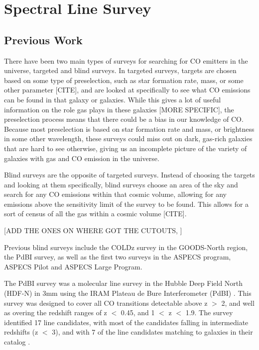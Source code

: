 \chapter{Spectral Line Survey}

\section{Previous Work}

There have been two main types of surveys for searching for CO emitters in the universe, targeted and blind surveys. In targeted surveys, targets are chosen based on some type of preselection, such as star formation rate, mass, or some other parameter [CITE], and are looked at specifically to see what CO emissions can be found in that galaxy or galaxies. While this gives a lot of useful information on the role gas plays in these galaxies [MORE SPECIFIC], the preselection process means that there could be a bias in our knowledge of CO. Because most preselection is based on star formation rate and mass, or brightness in some other wavelength, these surveys could miss out on dark, gas-rich galaxies that are hard to see otherwise, giving us an incomplete picture of the variety of galaxies with gas and CO emission in the universe. 

Blind surveys are the opposite of targeted surveys. Instead of choosing the targets and looking at them specifically, blind surveys choose an area of the sky and search for any CO emissions within that cosmic volume, allowing for any emissions above the sensitivity limit of the survey to be found. This allows for a sort of census of all the gas within a cosmic volume [CITE]. 

[ADD THE ONES ON WHERE GOT THE CUTOUTS, ]

Previous blind surveys include the COLDz survey in the GOODS-North region, the PdBI survey, as well as the first two surveys in the ASPECS program, ASPECS Pilot and ASPECS Large Program. 

The PdBI survey was a molecular line survey in the Hubble Deep Field North (HDF-N) in 3mm using the IRAM Plateau de Bure Interferometer (PdBI) \cite{decarli2014molecular}. This survey was designed to cover all CO transitions detectable above z $>$ 2, and well as overing the redshift ranges of z $<$ 0.45, and 1 $<$ z $<$ 1.9. The survey identified 17 line candidates, with most of the candidates falling in intermediate redshifts (z $<$ 3), and with 7 of the line candidates matching to galaxies in their catalog \cite{decarli2014molecular}. 

